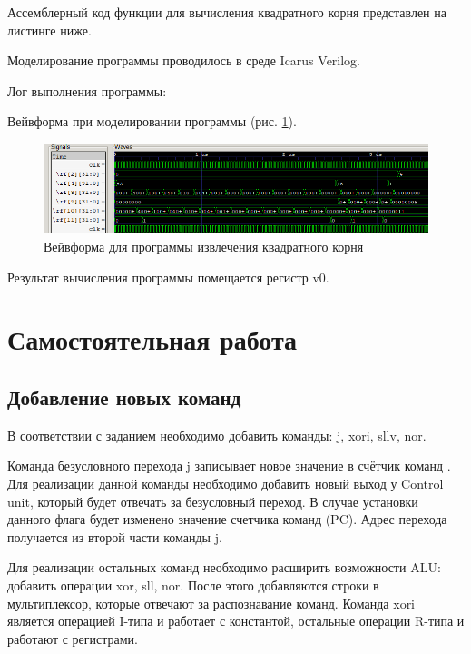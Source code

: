 \documentclass[a4paper,14pt]{article}
\begin{document}
	Ассемблерный код функции для вычисления квадратного корня представлен на листинге ниже.
	
	{\small {}}
	
	Моделирование программы проводилось в среде Icarus Verilog.
	
	Лог выполнения программы:
	
	{\small {}}
	
	Вейвформа при моделировании программы (рис. \ref{fig:02wvf}).
	
	\begin{figure}[H]
		\centering
		\includegraphics[width=0.95\linewidth]{images/02_wvf}
		\caption{Вейвформа для программы извлечения квадратного корня}
		\label{fig:02wvf}
	\end{figure}

	Результат вычисления программы помещается регистр v0.
	
	
	\section{Самостоятельная работа}
	
	\subsection{Добавление новых команд}
	
	В соответствии с заданием необходимо добавить команды: j, xori, sllv, nor.
	
	Команда безусловного перехода j записывает новое значение в счётчик команд \cite{Harris}.
	Для реализации данной команды необходимо добавить новый выход у Control unit, который будет отвечать за безусловный переход.
	В случае установки данного флага будет изменено значение счетчика команд (PC).
	Адрес перехода получается из второй части команды j.
	
	Для реализации остальных команд необходимо расширить возможности ALU: добавить операции xor, sll, nor.
	После этого добавляются строки в мультиплексор, которые отвечают за распознавание команд.
	Команда xori является операцией I-типа и работает с константой, остальные операции R-типа и работают с регистрами.
	
\end{document}
